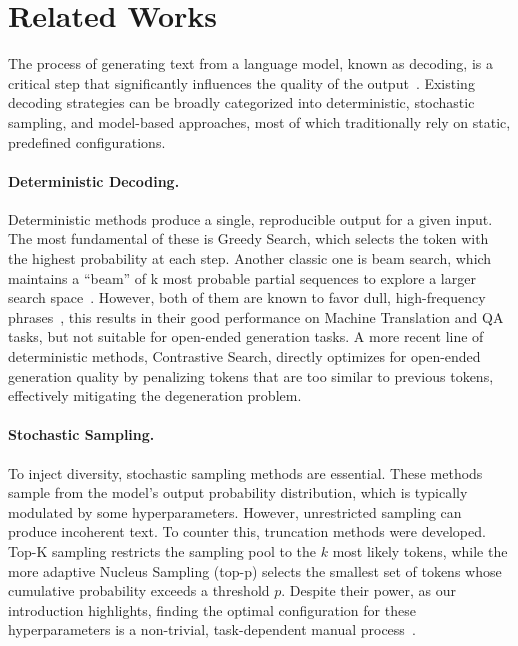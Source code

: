 \section{Related Works}

The process of generating text from a language model, known as decoding, is a critical step that significantly influences the quality of the output~\citep{Wang_2025, shi2024thorough}. Existing decoding strategies can be broadly categorized into deterministic, stochastic sampling, and model-based approaches, most of which traditionally rely on static, predefined configurations.

\paragraph{Deterministic Decoding.}
Deterministic methods produce a single, reproducible output for a given input. The most fundamental of these is Greedy Search, which selects the token with the highest probability at each step. Another classic one is beam search, which maintains a ``beam'' of k most probable partial sequences to explore a larger search space~\citep{sutskever2014sequence, graves2013generating}.  However, both of them are known to favor dull, high-frequency phrases~\citep{vijayakumar2016diverse}, this results in their good performance on Machine Translation and QA tasks, but not suitable for open-ended generation tasks. A more recent line of deterministic methods, Contrastive Search\citep{su2022contrastive, su2022}, directly optimizes for open-ended generation quality by penalizing tokens that are too similar to previous tokens, effectively mitigating the degeneration problem.

\paragraph{Stochastic Sampling.}
 To inject diversity, stochastic sampling methods are essential. These methods sample from the model's output probability distribution, which is typically modulated by some hyperparameters. However, unrestricted sampling can produce incoherent text. To counter this, truncation methods were developed. Top-K sampling\citep{fan2018hierarchical} restricts the sampling pool to the $k$ most likely tokens, while the more adaptive Nucleus Sampling (top-p)\citep{holtzmancurious} selects the smallest set of tokens whose cumulative probability exceeds a threshold $p$. Despite their power, as our introduction highlights, finding the optimal configuration for these hyperparameters is a non-trivial, task-dependent manual process~\citep{shi2024thorough}.

